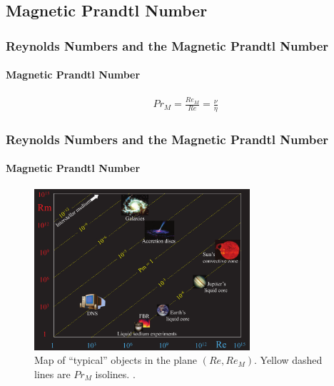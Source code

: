 \documentclass{beamer}
\begin{document}
\subsection{Magnetic Prandtl Number}

\begin{frame}
 \frametitle{Reynolds Numbers and the Magnetic Prandtl Number}
 \framesubtitle{Magnetic Prandtl Number}
 
  \begin{align}
  Pr_M = \frac{Re_M}{Re} =  \frac{\nu}{\eta} \nonumber
 \end{align}
 
\end{frame}

\begin{frame}
 \frametitle{Reynolds Numbers and the Magnetic Prandtl Number}
 \framesubtitle{Magnetic Prandtl Number}
 
 \begin{figure}[t]
  \includegraphics[width=8cm]{img/PrM_spectrum}
  \caption{Map of ``typical'' objects in the plane $(Re,Re_M)$. Yellow dashed lines are $Pr_M$ isolines. \cite{plunian2013shell}.}
  \centering
 \end{figure}
 
 
 
 
 
\end{frame}

\end{document}
